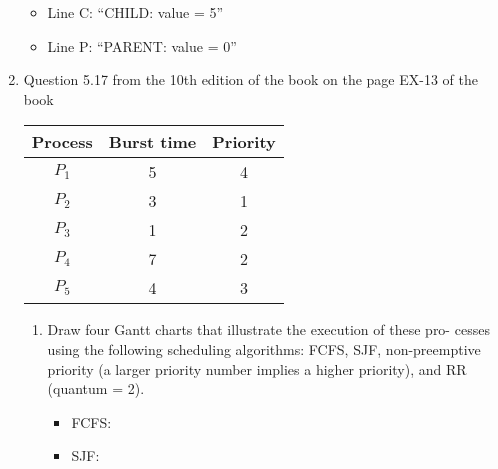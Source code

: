\documentclass{amsart}
\begin{document}
\begin{enumerate}
            \begin{itemize}
                \item Line C: ``CHILD: value = 5''
                \item Line P: ``PARENT: value = 0''
            \end{itemize}

        \item Question 5.17 from the 10th edition of the book on the page EX-13 of the book
            
        \begin{tabular}{|c|c|c|}
                \hline
                Process & Burst time & Priority \\
                \hline
                $P_1$ & 5 & 4 \\
                $P_2$ & 3 & 1 \\
                $P_3$ & 1 & 2 \\
                $P_4$ & 7 & 2 \\
                $P_5$ & 4 & 3 \\ \hline 
            \end{tabular}

            \begin{enumerate}
                \item Draw four Gantt charts that illustrate the execution of these pro- cesses using the following scheduling algorithms: FCFS, SJF, non-preemptive priority (a larger priority number implies a higher priority), and RR (quantum = 2).
                    \begin{itemize}
                        \item FCFS:
                        \bigskip

                        \item SJF: 
                        \bigskip



\end{itemize}
\end{enumerate}
\end{enumerate}
\end{document}
